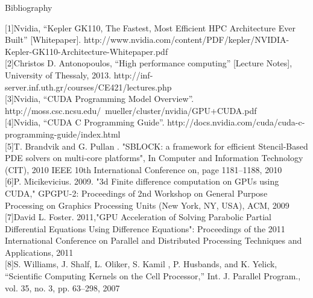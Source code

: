 { \fontsize{0,9cm}{5em}\selectfont
Bibliography\\
}
\begin{singlespace}



[1]Nvidia, “Kepler GK110, The Fastest, Most Efficient HPC Architecture Ever Built” [Whitepaper]. http://www.nvidia.com/content/PDF/kepler/NVIDIA-Kepler-GK110-Architecture-Whitepaper.pdf\\

[2]Christos D. Antonopoulos, “High performance computing” [Lecture Notes], University of Thessaly, 2013. http://inf-server.inf.uth.gr/courses/CE421/lectures.php\\

[3]Nvidia, “CUDA Programming Model Overview”. http://moss.csc.ncsu.edu/~mueller/cluster/nvidia/GPU+CUDA.pdf \\

[4]Nvidia, “CUDA C Programming Guide”. http://docs.nvidia.com/cuda/cuda-c-programming-guide/index.html\\

[5]T. Brandvik and G. Pullan . "SBLOCK: a framework for efficient Stencil-Based PDE solvers on multi-core platforms", In Computer and Information Technology (CIT), 2010 IEEE 10th International Conference on, page 1181–1188, 2010\\

[6]P. Micikevicius. 2009. "3d Finite difference computation on GPUs using CUDA," GPGPU-2: Proceedings of 2nd Workshop on General Purpose Processing on Graphics Processing Units (New York, NY, USA), ACM, 2009\\

[7]David L. Foster. 2011,"GPU Acceleration of Solving Parabolic Partial Differential Equations Using Difference Equations": Proceedings of the 2011 International Conference on Parallel and Distributed Processing Techniques and Applications, 2011\\

[8]S. Williams, J. Shalf, L. Oliker, S. Kamil , P. Husbands, and K. Yelick, “Scientific Computing Kernels on the Cell Processor,” Int. J. Parallel Program., vol. 35, no. 3, pp. 63–298, 2007\\


\end{singlespace}
